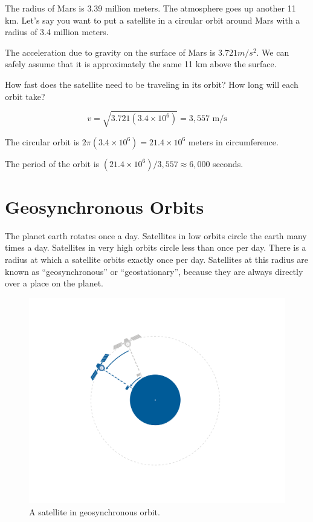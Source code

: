 

\begin{Exercise}[title={Mars Orbit}, label=mars_orbit]
  
  The radius of Mars is 3.39 million meters. The atmosphere goes up
  another 11 km.  Let's say you want to put a satellite in a circular
  orbit around Mars with a radius of 3.4 million meters.

  The acceleration due to gravity on the surface of Mars is $3.721
  m/s^2$. We can safely assume that it is approximately the same 11 km
  above the surface.

  How fast does the satellite need to be traveling in its orbit?  How
  long will each orbit take?

\end{Exercise}
\begin{Answer}[ref=circular]
  $$v = \sqrt{3.721(3.4 \times 10^6)} = 3,557\text{ m/s}$$

  The circular orbit is $2\pi(3.4 \times 10^6) = 21.4 \times 10^6$ meters in circumference.

  The period of the orbit is $(21.4 \times 10^6)/3,557 \approx 6,000$ seconds.
\end{Answer}

\section{Geosynchronous Orbits}
The planet earth rotates once a day.  Satellites in low orbits circle
the earth many times a day. Satellites in very high orbits circle
less than once per day. There is a radius at which a satellite orbits
exactly once per day.  Satellites at this radius are known as
``geosynchronous'' or ``geostationary'', because they are always
directly over a place on the planet.
\begin{figure}[htbp]
    \centering
    \includegraphics[width=.75\textwidth]{geoSync.png}
    \caption{A satellite in geosynchronous orbit.}
    \label{fig:geoSync}
\end{figure}

